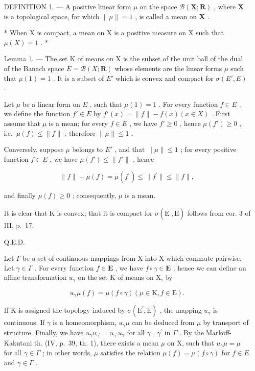 DEFINITION 1. --- A positive linear form \(\mu\) on the space \(\mathcal{B}(\mathbf{X};\mathbf{R})\) , where \(\mathbf{X}\) is a topological space, for which \(\|\mu\| = 1\) , is called a mean on \(\mathbf{X}\) .

* When X is compact, a mean on X is a positive measure on X such that \(\mu(X)=1\) . *

Lemma 1. --- The set K of means on X is the subset of the unit ball of the dual of the Banach space \(E = \mathcal{B}(X; \mathbf{R})\) whose elements are the linear forms \(\mu\) such that \(\mu(1)=1\) . It is a subset of \(E'\) which is convex and compact for \(\sigma(E', E)\) .

Let \(\mu\) be a linear form on \(E\) , such that \(\mu(1) = 1\) . For every function \(f \in E\) , we define the function \(f' \in E\) by \(f'(x) = \| f \| - f(x) (x \in X)\) . First assume that \(\mu\) is a mean; for every \(f \in E\) , we have \(f' \geqslant 0\) , hence \(\mu(f') \geqslant 0\) , i.e.~\(\mu(f) \leqslant \| f \|\) ; therefore \(\|\mu\| \leqslant 1\) .

Conversely, suppose \(\mu\) belongs to \(E'\) , and that \(\| \mu \| \leqslant 1\) ; for every positive function \(f \in E\) , we have \(\mu(f') \leqslant \| f'\|\) , hence

\[
\| f \| - \mu (f) = \mu \left(f ^ {\prime}\right) \leqslant \| f ^ {\prime} \| \leqslant \| f \|,
\]

and finally \(\mu(f) \geqslant 0\) ; consequently, \(\mu\) is a mean.

It is clear that K is convex; that it is compact for \(\sigma(\mathrm{E}^{\prime},\mathrm{E})\) follows from cor. 3 of III, p.~17.

Q.E.D.

Let \(\Gamma\) be a set of continuous mappings from X into X which commute pairwise. Let \(\gamma \in \Gamma\) . For every function \(f \in \mathbf{E}\) , we have \(f \circ \gamma \in \mathbf{E}\) ; hence we can define an affine transformation \(u_{\gamma}\) on the set K of means on X, by

\[
u _ {\gamma} \mu (f) = \mu (f \circ \gamma) (\mu \in \mathrm{K}, f \in \mathrm{E}).
\]

If K is assigned the topology induced by \(\sigma(\mathrm{E}^{\prime},\mathrm{E})\) , the mapping \(u_{\gamma}\) is continuous. If \(\gamma\) is a homeomorphism, \(u_{\gamma}\mu\) can be deduced from \(\mu\) by transport of structure. Finally, we have \(u_{\gamma}u_{\gamma^{\prime}} = u_{\gamma^{\prime}}u_{\gamma}\) for all \(\gamma\) , \(\gamma^{\prime}\) in \(\Gamma\) . By the Markoff-Kakutani th. (IV, p.~39, th. 1), there exists a mean \(\mu\) on X, such that \(u_{\gamma}\mu = \mu\) for all \(\gamma \in \Gamma\) ; in other words, \(\mu\) satisfies the relation \(\mu(f) = \mu(f \circ \gamma)\) for \(f \in E\) and \(\gamma \in \Gamma\) .

